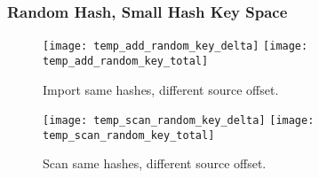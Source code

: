 \documentclass[12pt,twoside]{article}
\begin{document}
\subsubsection* {Random Hash, Small Hash Key Space}

\begin{figure}[H]
  \center
  \texttt{[image: temp\_add\_random\_key\_delta]}
  \texttt{[image: temp\_add\_random\_key\_total]}
  \caption*{Import same hashes, different source offset.}
\end{figure}

\begin{figure}[H]
  \center
  \texttt{[image: temp\_scan\_random\_key\_delta]}
  \texttt{[image: temp\_scan\_random\_key\_total]}
  \caption*{Scan same hashes, different source offset.}
\end{figure}
\end{document}
